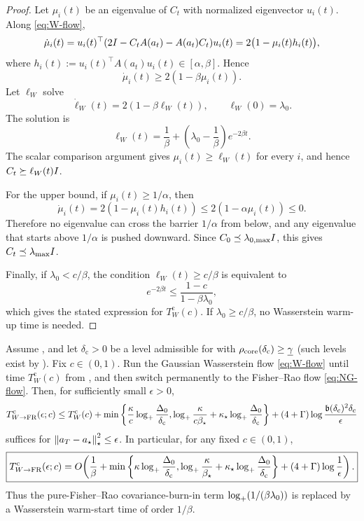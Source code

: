 \begin{proof}
Let $\mu_i(t)$ be an eigenvalue of $C_t$ with normalized eigenvector $u_i(t)$. Along
\eqref{eq:W-flow},
\[
    \dot\mu_i(t)
    =u_i(t)^\top(2I-C_tA(a_t)-A(a_t)C_t)u_i(t)
    =2\bigl(1-\mu_i(t)h_i(t)\bigr),
\]
where $h_i(t):=u_i(t)^\top A(a_t)u_i(t)\in[\alpha,\beta]$. Hence
\[
    \dot\mu_i(t)\ge 2(1-\beta\mu_i(t)).
\]
Let $\ell_W$ solve
\[
    \dot\ell_W(t)=2(1-\beta\ell_W(t)),
    \qquad
    \ell_W(0)=\lambda_0.
\]
The solution is
\[
    \ell_W(t)=\frac1\beta+\left(\lambda_0-\frac1\beta\right)e^{-2\beta t}.
\]
The scalar comparison argument gives $\mu_i(t)\ge\ell_W(t)$ for every $i$, and hence
$C_t\succeq\ell_W(t)I$.

For the upper bound, if $\mu_i(t)\ge1/\alpha$, then
\[
    \dot\mu_i(t)=2(1-\mu_i(t)h_i(t))\le 2(1-\alpha\mu_i(t))\le0.
\]
Therefore no eigenvalue can cross the barrier $1/\alpha$ from below, and any eigenvalue that
starts above $1/\alpha$ is pushed downward. Since $C_0\preceq\lambda_{0,\max}I$, this gives
$C_t\preceq\lambda_{\max}I$.

Finally, if $\lambda_0<c/\beta$, the condition $\ell_W(t)\ge c/\beta$ is equivalent to
\[
    e^{-2\beta t}\le \frac{1-c}{1-\beta\lambda_0},
\]
which gives the stated expression for $T_W^{\mathrm c}(c)$. If $\lambda_0\ge c/\beta$, no
Wasserstein warm-up time is needed.
\end{proof}

\begin{theorem}
\label{thm:cont-W-to-FR}
Assume , and let $\delta_{\mathrm c}>0$ be a level admissible
for  with $\rho_{\mathrm{core}}(\delta_{\mathrm c})\geq\underline{\gamma}$ (such levels
exist by ). Fix $c\in(0,1)$. Run the
Gaussian Wasserstein flow \eqref{eq:W-flow} until time $T_W^{\mathrm c}(c)$ from
, and then switch permanently to the Fisher--Rao flow
\eqref{eq:NG-flow}. Then, for sufficiently small $\epsilon>0$,
\[
    T_{W\to\mathrm{FR}}^{\mathrm c}(\epsilon;c)
    \le
    T_W^{\mathrm c}(c)
    +\min\left\{
        \frac{\kappa}{c}\log_+\frac{\Delta_0}{\delta_{\mathrm c}},
        \log_+\frac{\kappa}{c\beta_\star}
        +\kappa_\star\log_+\frac{\Delta_0}{\delta_{\mathrm c}}
    \right\}
    +(4+\Gamma)\log\frac{\mathfrak b(\delta_{\mathrm c})^2\delta_{\mathrm c}}{\epsilon}
\]
suffices for $\left\lVert a_T-a_\star\right\rVert_\star^2\leq\epsilon$.
In particular, for any fixed $c\in(0,1)$,
\[
    \boxed{
    T_{W\to\mathrm{FR}}^{\mathrm c}(\epsilon;c)
    =
    O\!\left(
        \frac1\beta
        +\min\left\{
            \kappa\log_+\frac{\Delta_0}{\delta_{\mathrm c}},
            \log_+\frac{\kappa}{\beta_\star}
            +\kappa_\star\log_+\frac{\Delta_0}{\delta_{\mathrm c}}
        \right\}
        +(4+\Gamma)\log\frac1\epsilon
    \right).
    }
\]
Thus the pure-Fisher--Rao covariance-burn-in term
$\log_+(1/(\beta\lambda_0))$ is replaced by a Wasserstein warm-start time of order $1/\beta$.
\end{theorem}

